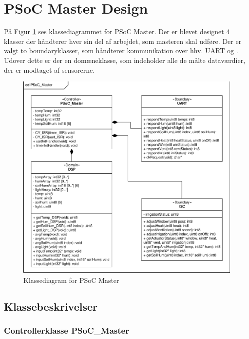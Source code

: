 \section{PSoC Master Design} \label{sec:PSoC_Master_design}

På Figur \ref{fig:Master_PSoC_klassediagram} ses klassediagrammet for PSoC Master. Der er blevet designet 4 klasser der håndterer hver sin del af arbejdet, som masteren skal udføre. Der er valgt to boundaryklasser, som håndterer kommunikation over hhv. UART og \IIC. Udover dette er der en domæneklasse, som indeholder alle de målte dataværdier, der er modtaget af sensorerne. 

\begin{figure}[h]
\centering 
\includegraphics[width={\textwidth}, trim=0 0 0 0, clip=true] {../fig/cd_PSoC_master.pdf}
\caption{Klassediagram for PSoC Master}
\label{fig:Master_PSoC_klassediagram}
\end{figure}

\clearpage

\subsection{Klassebeskrivelser}

\subsubsection{Controllerklasse PSoC\_Master}

